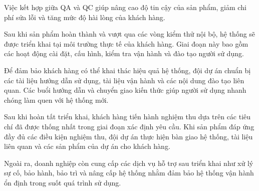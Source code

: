 \hspace{0.2cm}Việc kết hợp giữa QA và QC giúp nâng cao độ tin cậy của sản phẩm, giảm chi phí sửa lỗi và tăng mức độ hài lòng của khách hàng.



\hspace{0.2cm}Sau khi sản phẩm hoàn thành và vượt qua các vòng kiểm thử nội bộ, hệ thống sẽ được triển khai tại môi trường thực tế của khách hàng. Giai đoạn này bao gồm các hoạt động cài đặt, cấu hình, kiểm tra vận hành và đào tạo người sử dụng.

\hspace{0.2cm}Để đảm bảo khách hàng có thể khai thác hiệu quả hệ thống, đội dự án chuẩn bị các tài liệu hướng dẫn sử dụng, tài liệu vận hành và các nội dung đào tạo liên quan. Các buổi hướng dẫn và chuyển giao kiến thức giúp người sử dụng nhanh chóng làm quen với hệ thống mới.

\hspace{0.2cm}Sau khi hoàn tất triển khai, khách hàng tiến hành nghiệm thu dựa trên các tiêu chí đã được thống nhất trong giai đoạn xác định yêu cầu. Khi sản phẩm đáp ứng đầy đủ các điều kiện nghiệm thu, đội dự án thực hiện bàn giao hệ thống, tài liệu liên quan và các sản phẩm của dự án cho khách hàng.

\hspace{0.2cm}Ngoài ra, doanh nghiệp còn cung cấp các dịch vụ hỗ trợ sau triển khai như xử lý sự cố, bảo hành, bảo trì và nâng cấp hệ thống nhằm đảm bảo hệ thống vận hành ổn định trong suốt quá trình sử dụng.
